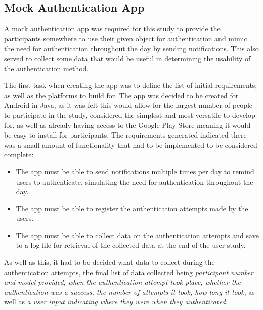 \documentclass{l4proj}
\begin{document}
\subsection{Mock Authentication App} \label{ssecapp}
\label{sec:app}
A mock authentication app was required for this study to provide the participants somewhere to use their given object for authentication and mimic the need for authentication throughout the day by sending notifications. This also served to collect some data that would be useful in determining the usability of the authentication method.
 
The first task when creating the app was to define the list of initial requirements, as well as the platforms to build for. The app was decided to be created for Android in Java, as it was felt this would allow for the largest number of people to participate in the study, considered the simplest and most versatile to develop for, as well as already having access to the Google Play Store meaning it would be easy to install for participants. The requirements generated indicated there was a small amount of functionality that had to be implemented to be considered complete:
\begin{itemize}
    \item The app must be able to send notifications multiple times per day to remind users to authenticate, simulating the need for authentication throughout the day.
    \item The app must be able to register the authentication attempts made by the users.
    \item The app must be able to collect data on the authentication attempts and save to a log file for retrieval of the collected data at the end of the user study.
\end{itemize}
As well as this, it had to be decided what data to collect during the authentication attempts, the final list of data collected being \textit{participant number and model provided, when the authentication attempt took place, whether the authentication was a success, the number of attempts it took, how long it took}, as well as \textit{a user input indicating where they were when they authenticated.}
\end{document}
